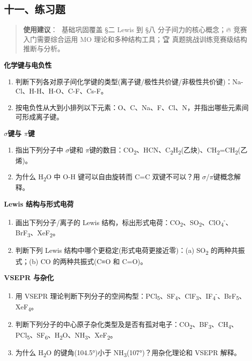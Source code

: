 \documentclass[a4paper,11pt]{ctexart}
\newcommand{\箭}{\ensuremath{\rightarrow}}
\newcommand{\左箭}{\ensuremath{\leftarrow}}
\newcommand{\上箭}{\ensuremath{\uparrow}}
\newcommand{\下箭}{\ensuremath{\downarrow}}
\newcommand{\衡}{\ensuremath{\rightleftharpoons}}
\newcommand{\双箭}{\ensuremath{\leftrightarrow}}
\newcommand{\约等于}{\ensuremath{\approx}}
\newcommand{\小于等于}{\ensuremath{\leq}}
\newcommand{\大于等于}{\ensuremath{\geq}}
\newcommand{\不等于}{\ensuremath{\neq}}
\newcommand{\西格马}{\ensuremath{\sigma}}
\newcommand{\派}{\ensuremath{\pi}}
\begin{document}
\subsection{十一、练习题}\label{ux5341ux4e00ux7ec3ux4e60ux9898}

\begin{quote}
\textbf{使用建议}：🌱 基础巩固覆盖 §二 Lewis 到 §八 分子间力的核心概念；🔥 竞赛入门需要综合运用 MO 理论和多种结构工具；🏆 真题挑战训练竞赛级结构推断与分析。
\end{quote}

\textbf{化学键与电负性}

\begin{enumerate}
\def\labelenumi{\arabic{enumi}.}
\item
  判断下列各对原子间化学键的类型(离子键/极性共价键/非极性共价键)：Na-Cl、H-H、H-O、C-F、Cs-F。
\item
  按电负性从大到小排列以下元素：O、C、Na、F、Cl、N，并指出哪些元素间可形成离子键。
\end{enumerate}

\textbf{\西格马 键与 \派 键}

\begin{enumerate}
\def\labelenumi{\arabic{enumi}.}
\setcounter{enumi}{2}
\item
  指出下列分子中 \西格马 键和 \派 键的数目：CO\textsubscript{2}、HCN、C\textsubscript{2}H\textsubscript{2}(乙炔)、CH\textsubscript{2}=CH\textsubscript{2}(乙烯)。
\item
  为什么 H\textsubscript{2}O 中 O-H 键可以自由旋转而 C=C 双键不可以？用 \西格马/\派 键概念解释。
\end{enumerate}

\textbf{Lewis 结构与形式电荷}

\begin{enumerate}
\def\labelenumi{\arabic{enumi}.}
\setcounter{enumi}{4}
\item
  画出下列分子/离子的 Lewis 结构，标出形式电荷：CO\textsubscript{2}、SO\textsubscript{2}、ClO\textsubscript{4}\textsuperscript{-}、BrF\textsubscript{3}、XeF\textsubscript{2}。
\item
  判断下列 Lewis 结构中哪个更稳定(形式电荷更接近零)：(a) SO\textsubscript{2} 的两种共振式；(b) CO 的两种共振式(C≡O 和 C=O)。
\end{enumerate}

\textbf{VSEPR 与杂化}

\begin{enumerate}
\def\labelenumi{\arabic{enumi}.}
\setcounter{enumi}{6}
\item
  用 VSEPR 理论判断下列分子的空间构型：PCl\textsubscript{5}、SF\textsubscript{4}、ClF\textsubscript{3}、IF\textsubscript{4}\textsuperscript{-}、BrF\textsubscript{5}、XeF\textsubscript{4}。
\item
  判断下列分子的中心原子杂化类型及是否有孤对电子：CO\textsubscript{2}、BF\textsubscript{3}、CH\textsubscript{4}、PCl\textsubscript{5}、SF\textsubscript{6}、H\textsubscript{2}O、NH\textsubscript{3}、XeF\textsubscript{2}。
\item
  为什么 H\textsubscript{2}O 的键角(104.5°)小于 NH\textsubscript{3}(107°)？用杂化理论和 VSEPR 解释。
\end{enumerate}
\end{document}
